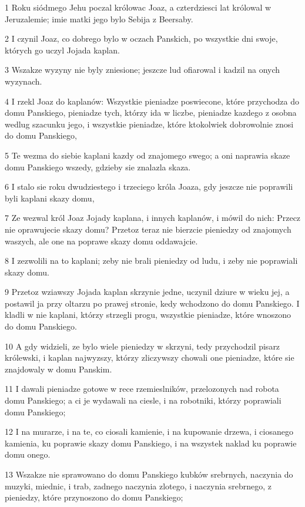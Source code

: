 \par 1 Roku siódmego Jehu poczal królowac Joaz, a czterdziesci lat królowal w Jeruzalemie; imie matki jego bylo Sebija z Beersaby.
\par 2 I czynil Joaz, co dobrego bylo w oczach Panskich, po wszystkie dni swoje, których go uczyl Jojada kaplan.
\par 3 Wszakze wyzyny nie byly zniesione; jeszcze lud ofiarowal i kadzil na onych wyzynach.
\par 4 I rzekl Joaz do kaplanów: Wszystkie pieniadze poswiecone, które przychodza do domu Panskiego, pieniadze tych, którzy ida w liczbe, pieniadze kazdego z osobna wedlug szacunku jego, i wszystkie pieniadze, które ktokolwiek dobrowolnie znosi do domu Panskiego,
\par 5 Te wezma do siebie kaplani kazdy od znajomego swego; a oni naprawia skaze domu Panskiego wszedy, gdzieby sie znalazla skaza.
\par 6 I stalo sie roku dwudziestego i trzeciego króla Joaza, gdy jeszcze nie poprawili byli kaplani skazy domu,
\par 7 Ze wezwal król Joaz Jojady kaplana, i innych kaplanów, i mówil do nich: Przecz nie oprawujecie skazy domu? Przetoz teraz nie bierzcie pieniedzy od znajomych waszych, ale one na poprawe skazy domu oddawajcie.
\par 8 I zezwolili na to kaplani; zeby nie brali pieniedzy od ludu, i zeby nie poprawiali skazy domu.
\par 9 Przetoz wziawszy Jojada kaplan skrzynie jedne, uczynil dziure w wieku jej, a postawil ja przy oltarzu po prawej stronie, kedy wchodzono do domu Panskiego. I kladli w nie kaplani, którzy strzegli progu, wszystkie pieniadze, które wnoszono do domu Panskiego.
\par 10 A gdy widzieli, ze bylo wiele pieniedzy w skrzyni, tedy przychodzil pisarz królewski, i kaplan najwyzszy, którzy zliczywszy chowali one pieniadze, które sie znajdowaly w domu Panskim.
\par 11 I dawali pieniadze gotowe w rece rzemieslników, przelozonych nad robota domu Panskiego; a ci je wydawali na ciesle, i na robotniki, którzy poprawiali domu Panskiego;
\par 12 I na murarze, i na te, co ciosali kamienie, i na kupowanie drzewa, i ciosanego kamienia, ku poprawie skazy domu Panskiego, i na wszystek naklad ku poprawie domu onego.
\par 13 Wszakze nie sprawowano do domu Panskiego kubków srebrnych, naczynia do muzyki, miednic, i trab, zadnego naczynia zlotego, i naczynia srebrnego, z pieniedzy, które przynoszono do domu Panskiego;
